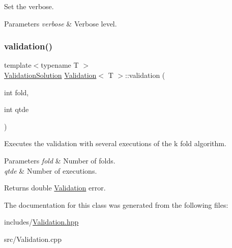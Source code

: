 Set the verbose. 


\begin{DoxyParams}{Parameters}
{\em verbose} & Verbose level. \\
\hline
\end{DoxyParams}
\mbox{\label{class_validation_aa7f79be36229a955f67a29556152f373}} 
\subsubsection{\texorpdfstring{validation()}{validation()}}
{\footnotesize\ttfamily template$<$typename T $>$ \\
\mbox{\hyperlink{class_validation_solution}{Validation\+Solution}} \mbox{\hyperlink{class_validation}{Validation}}$<$ T $>$\+::validation (\begin{DoxyParamCaption}\item[{int}]{fold,  }\item[{int}]{qtde }\end{DoxyParamCaption})}



Executes the validation with several executions of the k fold algorithm. 


\begin{DoxyParams}{Parameters}
{\em fold} & Number of folds. \\
\hline
{\em qtde} & Number of executions. \\
\hline
\end{DoxyParams}
\begin{DoxyReturn}{Returns}
double \mbox{\hyperlink{class_validation}{Validation}} error. 
\end{DoxyReturn}


The documentation for this class was generated from the following files\+:\begin{DoxyCompactItemize}
\item 
includes/\mbox{\hyperlink{_validation_8hpp}{Validation.\+hpp}}\item 
src/Validation.\+cpp\end{DoxyCompactItemize}
